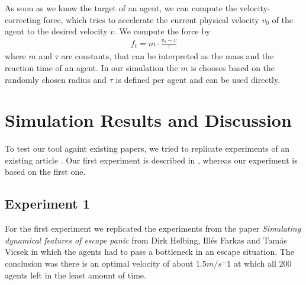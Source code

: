 \documentclass[11pt]{article}
\begin{document}
\begin{itemize}
	As soon as we know the target of an agent, we can compute the velocity-correcting force, which tries to accelerate the current physical velocity $v_0$ of the agent to the desired velocity $v$. We compute the force by    
	\begin{align*}
	  f_t = m \cdot \frac{v_0-v}{\tau}
	\end{align*}
	where $m$ and $\tau$ are constants, that can be interpreted as the mass and the reaction time of an agent. In our simulation the $m$ is chooses based on the randomly chosen radius and $\tau$ is defined per agent and can be used directly.
    
\end{itemize}

\section{Simulation Results and Discussion}
To test our tool againt existing papers, we tried to replicate experiments of an existing article \cite{Helbing}. Our first experiment is described in \cite{Helbing}, whereas our experiment is based on the first one.


\subsection{Experiment 1}

For the first experiment we replicated the experiments from the paper \textit{Simulating dynamical features of escape panic} from Dirk Helbing, Illés Farkas and Tamás Vicsek in which the agents had to pass a bottleneck in an escape situation. The conclusion was there is an optimal velocity of about $1.5 m/s^-1$ at which all 200 agents left in the least amount of time.
\end{document}
